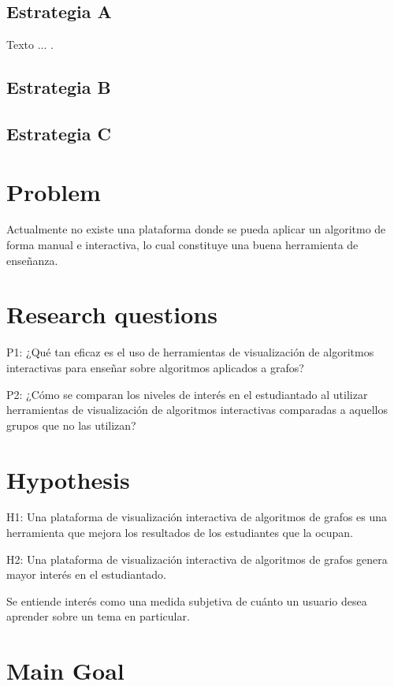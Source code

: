 \documentclass[submission]{eptcs}
\begin{document}
\subsection{ Estrategia A}

Texto ...  \cite{hopper2001empirical}. \\


\subsection{ Estrategia B}


\subsection{ Estrategia C}


\section{Problem}

Actualmente no existe una plataforma donde se pueda aplicar
un algoritmo de forma manual e interactiva, lo cual constituye
una buena herramienta de enseñanza. 


\section{Research questions}

P1: ¿Qué tan eficaz es el uso de herramientas de visualización de algoritmos interactivas para
enseñar sobre algoritmos aplicados a grafos?

P2: ¿Cómo se comparan los niveles de interés en el estudiantado al utilizar herramientas
de visualización de algoritmos interactivas comparadas a aquellos grupos que no las utilizan?


\section{Hypothesis}

H1: Una plataforma de visualización interactiva de algoritmos de grafos
es una herramienta que mejora los resultados de los estudiantes que la ocupan.

H2: Una plataforma de visualización interactiva de algoritmos de grafos
genera mayor interés en el estudiantado.

Se entiende interés como una medida subjetiva de cuánto un usuario desea
aprender sobre un tema en particular. 

\section{Main Goal}
\end{document}
